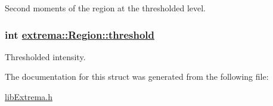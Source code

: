 Second moments of the region at the thresholded level. 

\hypertarget{structextrema_1_1Region_e982d7dbf40e25fc6b8e16f2a5f3b9fe}{
\subsubsection[threshold]{\setlength{\rightskip}{0pt plus 5cm}int \hyperlink{structextrema_1_1Region_e982d7dbf40e25fc6b8e16f2a5f3b9fe}{extrema::Region::threshold}}}
\label{structextrema_1_1Region_e982d7dbf40e25fc6b8e16f2a5f3b9fe}


Thresholded intensity. 



The documentation for this struct was generated from the following file:\begin{CompactItemize}
\item 
\hyperlink{libExtrema_8h}{lib\-Extrema.h}\end{CompactItemize}

